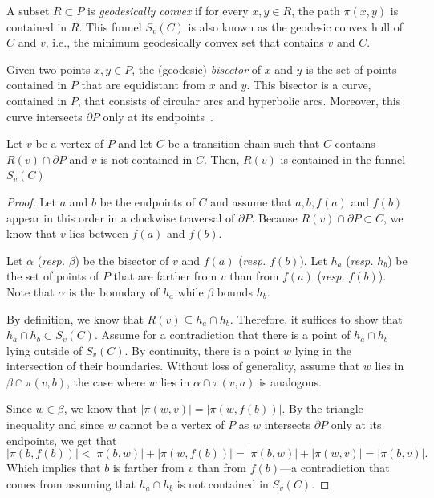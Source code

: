 \documentclass[a4paper,UKenglish]{lipics}
\newcommand{\fn}[2]{\ensuremath{S_{\scriptscriptstyle #1}(#2)}}
\newcommand{\ff}[1]{\ensuremath{f(#1)}}
\newcommand{\g}[2]{\ensuremath{|\pi(#1, #2)|}}
\newcommand{\p}[2]{\ensuremath{\pi(#1, #2)}}
\begin{document}
A subset $R\subset P$ is \emph{geodesically convex} if for every $x,y\in R$, the path $\p{x}{y}$ is contained in $R$.
This funnel $\fn{v}{C}$ is also known as the geodesic convex hull of $C$ and $v$, i.e., the minimum geodesically convex set that contains $v$ and $C$.

Given two points $x,y\in P$, the (geodesic) \emph{bisector} of $x$ and $y$ is the set of points contained in $P$ that are equidistant from $x$ and $y$. This bisector is a curve, contained in $P$, that consists of circular arcs and hyperbolic arcs. Moreover, this curve intersects $\partial P$ only at its endpoints~\cite[Lemma 3.22]{aronov1989geodesic}.

\begin{lemma}\label{lemma:Funnel contains Voronoi cell}
Let $v$ be a vertex of $P$ and let $C$ be a transition chain such that $C$ contains $R(v)\cap \partial P$ and $v$ is not contained in $C$.
Then, $R(v)$ is contained in the funnel $\fn{v}{C}$
\end{lemma}
\begin{proof}
Let $a$ and $b$ be the endpoints of $C$ and assume that $a,b, \ff{a}$ and $\ff{b}$ appear in this order in a clockwise traversal of $\partial P$.
Because $R(v)\cap \partial P\subset C$, we know that $v$ lies between $\ff{a}$ and $\ff{b}$.

Let $\alpha$ (\emph{resp.} $\beta$) be the bisector of $v$ and $\ff{a}$ (\emph{resp.} $\ff{b}$).
Let $h_a$ (\emph{resp.} $h_b$) be the set of points of $P$ that are farther from $v$ than from $\ff{a}$ (\emph{resp.} $\ff{b}$).
Note that $\alpha$ is the boundary of $h_a$ while $\beta$ bounds $h_b$.

By definition, we know that $R(v)\subseteq h_a\cap h_b$. Therefore, it suffices to show that $h_a\cap h_b\subset \fn{v}{C}$.
Assume for a contradiction that there is a point of $h_a\cap h_b$ lying outside of $\fn{v}{C}$. By continuity, there is a point $w$ lying in the intersection of their boundaries. 
Without loss of generality, assume that $w$ lies in $\beta \cap \p{v}{b}$, the case where $w$ lies in $\alpha \cap \p{v}{a}$ is analogous. 

Since $w\in \beta$, we know that $\g{w}{v} = \g{w}{ \ff{b}}$. By the triangle inequality and since $w$ cannot be a vertex of $P$ as $w$ intersects $\partial P$ only at its endpoints, we get that
$$\g{b}{\ff{b}} < \g{b}{w} + \g{w}{\ff{b}} = \g{b}{w} + \g{w}{v} = \g{b}{v}.$$
Which implies that $b$ is farther from $v$ than from $\ff{b}$---a contradiction that comes from assuming that $h_a\cap h_b$ is not contained in $\fn{v}{C}$.
\end{proof}
\end{document}
